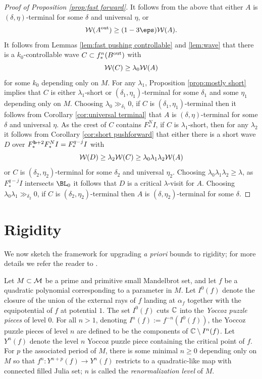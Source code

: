 \documentclass[12pt]{amsart}
\begin{document}
\begin{proof}[Proof of Proposition \ref{prop:fast forward}]
	It follows from the above that either $A$ is $(\delta, \eta)$-terminal for some $\delta$ and universal $\eta$, or $$\WW(A^\outbr)\geq (1-3\eps)\WW(A).$$
	It follows from Lemmas \ref{lem:fast pushing controllable} and \ref{lem:wave} that there is a $k_0$-controllable wave $C\subset f_*^n(B^{\mathrm{out}})$ with 
	$$\mathcal W(C)\geq \lambda_0\mathcal W(A)$$
	for some $k_0$ depending only on $M$. 
	For any $\lambda_1$, Proposition \ref{prop:mostly short} implies that $C$ is either $\lambda_1$-short or $(\delta_1, \eta_1)$-terminal for some $\delta_1$ and some $\eta_1$ depending only on $M$. 
	Choosing $\lambda_0\gg_{\delta_1} 0$, if $C$ is $(\delta_1, \eta_1)$-terminal then it follows from Corollary \ref{cor:universal terminal} that $A$ is $(\delta, \eta)$-terminal for some $\delta$ and universal $\eta$. 
	As the crest of $C$ contains $F_*^NI$, if $C$ is $\lambda_1$-short, then for any $\lambda_2$ it follows from Corollary \ref{cor:short pushforward} that either there is a short wave $D$ over $F_*^{\mathbf b+2}F_*^NI= F_*^{q-j}I$ with $$\mathcal W(D)\geq \lambda_2\mathcal W(C)\geq \lambda_0\lambda_1\lambda_2\mathcal W(A)$$ or $C$ is $(\delta_2, \eta_2)$-terminal for some $\delta_2$ and universal $\eta_2$. 
	Choosing $\lambda_0\lambda_1\lambda_2\geq \lambda$, as  $F_*^{q-j}I$ intersects $\BL_0$ it follows that $D$ is a critical $\lambda$-visit for $A$.
	Choosing $\lambda_0\lambda_1\gg_{\delta_2} 0$, if $C$ is $(\delta_2, \eta_2)$-terminal then $A$ is $(\delta, \eta_2)$-terminal for some $\delta$.
\end{proof}

\section{Rigidity}\label{sec:rigidity}

We now sketch the framework for upgrading \emph{a priori} bounds to rigidity; for more details we refer the reader to \cite{lyubich1997dynamics}.

Let $M\subset\mathcal M$ be a prime and primitive small Mandelbrot set, and let $f$ be a quadratic polynomial corresponding to a parameter in $M$. 
Let $I^0(f)$ denote the closure of the union of the external rays of $f$ landing at $\alpha_f$ together with the equipotential of $f$ at potential $1$. The set $I^0(f)$ cuts $\mathbb C$ into the \emph{Yoccoz puzzle pieces}  of level $0$. 
For all $n>1$, denoting $I^n(f):= f^{-n}(I^0(f))$, the Yoccoz puzzle pieces of level $n$ are defined to be the components of $\mathbb C\setminus I^n(f)$. 
Let $Y^n(f)$ denote the level $n$ Yoccoz puzzle piece containing the critical point of $f$.
For $p$ the associated period of $M$, there is some minimal $n\geq 0$ depending only on $M$ so that $f^n:Y^{n+p}(f)\to Y^n(f)$ restricts to a quadratic-like map with connected filled Julia set; $n$ is called the \emph{renormalization level} of $M$. 
\end{document}
